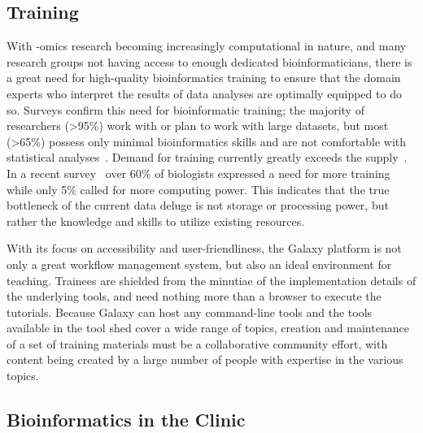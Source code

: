 \begin{justify}
\subsection{Training}
With -omics research becoming increasingly computational in nature, and many research groups not having access to enough dedicated bioinformaticians, there is a great need for high-quality bioinformatics training to ensure that the domain experts who interpret the results of data analyses are optimally equipped to do so. Surveys confirm this need for bioinformatic training; the majority of researchers (>95\%) work with or plan to work with large datasets, but most (>65\%) possess only minimal bioinformatics skills and are not comfortable with statistical analyses~\cite{larcombe2017elixir,williams2017vision}. Demand for training currently greatly exceeds the supply~\cite{attwood2017global}. In a recent survey~\cite{survey2013embl} over 60\% of biologists expressed a need for more training while only 5\% called for more computing power. This indicates that the true bottleneck of the current data deluge is not storage or processing power, but rather the knowledge and skills to utilize existing resources.

With its focus on accessibility and user-friendliness, the Galaxy platform is not only a great workflow management system, but also an ideal environment for teaching. Trainees are shielded from the minutiae of the implementation details of the underlying tools, and need nothing more than a browser to execute the tutorials. Because Galaxy can host any command-line tools and the tools available in the tool shed cover a wide range of topics, creation and maintenance of a set of training materials must be a collaborative community effort, with content being created by a large number of people with expertise in the various topics.

\subsection{Bioinformatics in the Clinic}


\end{justify}
